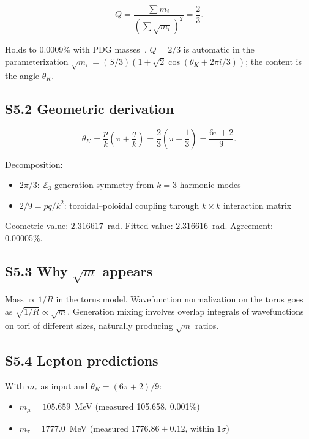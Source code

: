 \documentclass[11pt,a4paper]{article}
\begin{document}
\begin{equation}
  Q = \frac{\sum m_i}{\left(\sum\sqrt{m_i}\right)^2} = \frac{2}{3}.
\end{equation}

Holds to 0.0009\% with PDG masses~\cite{pdg2022}. $Q = 2/3$ is automatic in the parameterization $\sqrt{m_i} = (S/3)(1 + \sqrt{2}\cos(\theta_K + 2\pi i/3))$; the content is the angle $\theta_K$.

\subsection{S5.2 Geometric derivation}

\begin{equation}
  \theta_K = \frac{p}{k}\left(\pi + \frac{q}{k}\right) = \frac{2}{3}\left(\pi + \frac{1}{3}\right) = \frac{6\pi + 2}{9}.
\end{equation}

Decomposition:
\begin{itemize}
  \item $2\pi/3$: $\mathbb{Z}_3$ generation symmetry from $k=3$ harmonic modes
  \item $2/9 = pq/k^2$: toroidal--poloidal coupling through $k\times k$ interaction matrix
\end{itemize}

Geometric value: $2.316617$~rad. Fitted value: $2.316616$~rad. Agreement: 0.00005\%.

\subsection{S5.3 Why \texorpdfstring{$\sqrt{m}$}{sqrt(m)} appears}

Mass $\propto 1/R$ in the torus model. Wavefunction normalization on the torus goes as $\sqrt{1/R} \propto \sqrt{m}$. Generation mixing involves overlap integrals of wavefunctions on tori of different sizes, naturally producing $\sqrt{m}$ ratios.

\subsection{S5.4 Lepton predictions}

With $m_e$ as input and $\theta_K = (6\pi+2)/9$:
\begin{itemize}
  \item $m_\mu = 105.659$~MeV (measured 105.658, 0.001\%)
  \item $m_\tau = 1777.0$~MeV (measured $1776.86 \pm 0.12$, within $1\sigma$)
\end{itemize}
\end{document}
